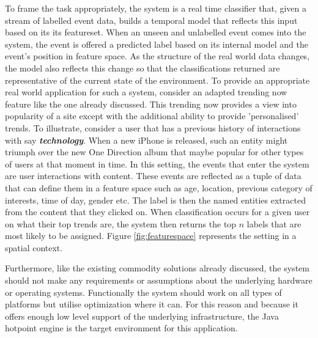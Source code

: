 \documentclass[a4paper,11pt]{scrreprt}
\begin{document}
To frame the task appropriately, the system is a real time classifier that, given a stream of labelled event data, builds a temporal model that reflects this input based on its its featureset. When an unseen and unlabelled event comes into the system, the event is offered a predicted label based on its internal model and the event's position in feature space. As the structure of the real world data changes, the model also reflects this change so that the classifications returned are representative of the current state of the environment. To provide an appropriate real world application for such a system, consider an adapted trending now feature like the one already discussed. This trending now provides a view into popularity of a site except with the additional ability to provide 'personalised' trends. To illustrate, consider a user that has a previous history of interactions with say \textit{\textbf{technology}}. When a new iPhone is released, such an entity might triumph over the new One Direction album that maybe popular for other types of users at that moment in time. In this setting, the events that enter the system are user interactions with content. These events are reflected as a tuple of data that can define them in a feature space such as age, location, previous category of interests, time of day, gender etc. The label is then the named entities extracted from the content that they clicked on. When classification occurs for a given user on what their top trends are, the system then returns the top \(n\) labels that are most likely to be assigned. Figure \ref{fig:featurespace} represents the setting in a spatial context.

Furthermore, like the existing commodity solutions already discussed, the system should not make any requirements or assumptions about the underlying hardware or operating systems. Functionally the system should work on all types of platforms but utilise optimization where it can. For this reason and because it offers enough low level support of the underlying infrastructure, the Java hotpoint engine is the target environment for this application.
 
\end{document}
